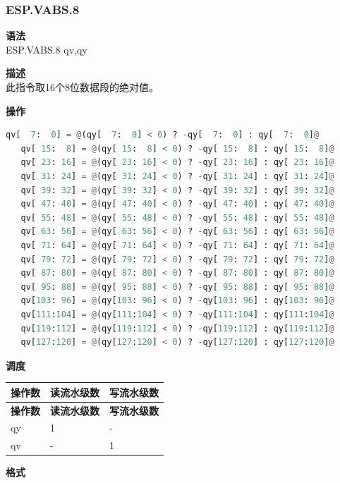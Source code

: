 \newpage
\subsubsection{ESP.VABS.8}\label{instruction:ESPVABS8}
\textbf{语法}\\
ESP.VABS.8 qv,qy

\textbf{描述}\\
此指令取16个8位数据段的绝对值。

\textbf{操作}\\
\begin{lstlisting}[language=Python, escapechar=@]
   qv[  7:  0] = @(qy[  7:  0] < 0) ? -qy[  7:  0] : qy[  7:  0]@
   qv[ 15:  8] = @(qy[ 15:  8] < 0) ? -qy[ 15:  8] : qy[ 15:  8]@
   qv[ 23: 16] = @(qy[ 23: 16] < 0) ? -qy[ 23: 16] : qy[ 23: 16]@
   qv[ 31: 24] = @(qy[ 31: 24] < 0) ? -qy[ 31: 24] : qy[ 31: 24]@
   qv[ 39: 32] = @(qy[ 39: 32] < 0) ? -qy[ 39: 32] : qy[ 39: 32]@
   qv[ 47: 40] = @(qy[ 47: 40] < 0) ? -qy[ 47: 40] : qy[ 47: 40]@
   qv[ 55: 48] = @(qy[ 55: 48] < 0) ? -qy[ 55: 48] : qy[ 55: 48]@
   qv[ 63: 56] = @(qy[ 63: 56] < 0) ? -qy[ 63: 56] : qy[ 63: 56]@
   qv[ 71: 64] = @(qy[ 71: 64] < 0) ? -qy[ 71: 64] : qy[ 71: 64]@
   qv[ 79: 72] = @(qy[ 79: 72] < 0) ? -qy[ 79: 72] : qy[ 79: 72]@
   qv[ 87: 80] = @(qy[ 87: 80] < 0) ? -qy[ 87: 80] : qy[ 87: 80]@
   qv[ 95: 88] = @(qy[ 95: 88] < 0) ? -qy[ 95: 88] : qy[ 95: 88]@
   qv[103: 96] = @(qy[103: 96] < 0) ? -qy[103: 96] : qy[103: 96]@
   qv[111:104] = @(qy[111:104] < 0) ? -qy[111:104] : qy[111:104]@
   qv[119:112] = @(qy[119:112] < 0) ? -qy[119:112] : qy[119:112]@
   qv[127:120] = @(qy[127:120] < 0) ? -qy[127:120] : qy[127:120]@
\end{lstlisting}


\textbf{调度}\\
\begin{longtable}[c]{|l|l|l|}
    \hline
    \rowcolor{lightgray}
    \textbf{操作数} & \textbf{读流水级数} & \textbf{写流水级数} \\\hline
    \endfirsthead
    \hline
    \rowcolor{lightgray}
     \textbf{操作数} & \textbf{读流水级数} & \textbf{写流水级数} \\\hline
    \endhead
    \hline
    \endfoot

    qy & 1 & - \\\hline
     qv & - & 1

\end{longtable}

\textbf{格式}\\

